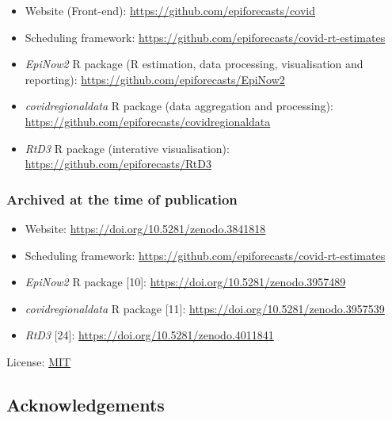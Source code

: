\documentclass[
]{article}
\providecommand{\tightlist}{%
  \setlength{\itemsep}{0pt}\setlength{\parskip}{0pt}}
\begin{document}
\begin{itemize}
\tightlist
\item
  Website (Front-end): \url{https://github.com/epiforecasts/covid}
\item
  Scheduling framework:
  \url{https://github.com/epiforecasts/covid-rt-estimates}
\item
  \emph{EpiNow2} R package (R estimation, data processing, visualisation
  and reporting): \url{https://github.com/epiforecasts/EpiNow2}
\item
  \emph{covidregionaldata} R package (data aggregation and processing):
  \url{https://github.com/epiforecasts/covidregionaldata}
\item
  \emph{RtD3} R package (interative visualisation):
  \url{https://github.com/epiforecasts/RtD3}
\end{itemize}

\hypertarget{archived-at-the-time-of-publication}{%
\subsubsection{Archived at the time of
publication}\label{archived-at-the-time-of-publication}}

\begin{itemize}
\tightlist
\item
  Website: \url{https://doi.org/10.5281/zenodo.3841818}
\item
  Scheduling framework:
  \url{https://github.com/epiforecasts/covid-rt-estimates}
\item
  \emph{EpiNow2} R package {[}10{]}:
  \url{https://doi.org/10.5281/zenodo.3957489}
\item
  \emph{covidregionaldata} R package {[}11{]}:
  \url{https://doi.org/10.5281/zenodo.3957539}
\item
  \emph{RtD3} {[}24{]}: \url{https://doi.org/10.5281/zenodo.4011841}
\end{itemize}

License: \href{https://opensource.org/licenses/MIT}{MIT}

\hypertarget{acknowledgements}{%
\subsection{Acknowledgements}\label{acknowledgements}}
\end{document}
